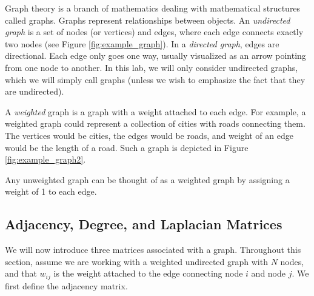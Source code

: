 %
%



Graph theory is a branch of mathematics dealing with mathematical structures called graphs.  Graphs represent relationships between objects.
An \emph{undirected graph} is a set of nodes (or vertices) and edges, where each edge connects exactly two nodes (see Figure \ref{fig:example_graph}).
In a \emph{directed graph}, edges are directional. Each edge only goes one way, usually visualized as an arrow pointing from one node to another.
In this lab, we will only consider undirected graphs, which we will simply call graphs (unless we wish to emphasize the fact that they are undirected).


A \emph{weighted} graph is a graph with a weight attached to each edge.
For example, a weighted graph could represent a collection of cities with roads connecting them.
The vertices would be cities, the edges would be roads, and weight of an edge would be the length of a road.
Such a graph is depicted in Figure \ref{fig:example_graph2}.

Any unweighted graph can be thought of as a weighted graph by assigning a weight of 1 to each edge.

\subsection*{Adjacency, Degree, and Laplacian Matrices}
We will now introduce three matrices associated with a graph.
Throughout this section, assume we are working with a weighted undirected graph with $N$ nodes, and that $w_{ij}$ is the weight attached to the edge connecting node $i$ and node $j$.
We first define the adjacency matrix.

